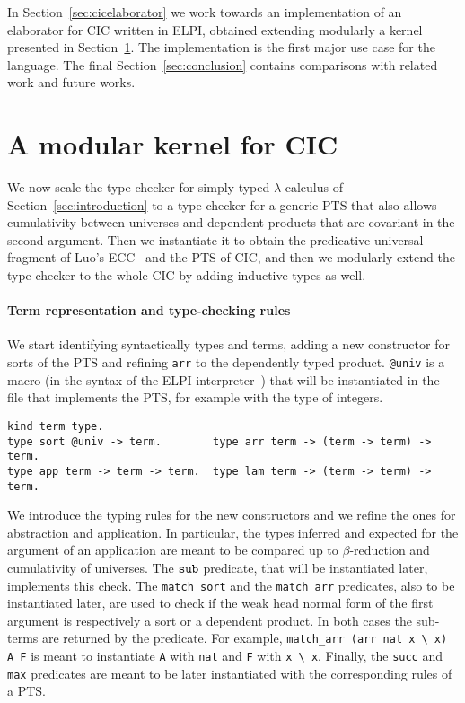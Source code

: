 \documentclass{easychair}
\begin{document}
In Section~\ref{sec:cicelaborator} we work towards an implementation of an elaborator for CIC written in ELPI, obtained extending modularly a kernel presented in Section~\ref{sec:kernel}. The implementation is the first major use case for the language.
The final Section~\ref{sec:conclusion} contains comparisons with related work and future works.

\section{A modular kernel for CIC}\label{sec:kernel}

We now scale the type-checker for simply typed $\lambda$-calculus of Section~\ref{sec:introduction} to a type-checker for a generic PTS that also allows cumulativity between universes and dependent products that are covariant in the second argument. Then we instantiate it to obtain the predicative universal fragment of Luo's ECC~\cite{ecc} and the PTS of CIC, and then we modularly extend the type-checker to the whole CIC by adding inductive types as well.

\paragraph{Term representation and type-checking rules}
We start identifying syntactically types and terms, adding a new constructor for sorts of the PTS and refining \verb+arr+ to the dependently typed product.
\verb+@univ+ is a macro (in the syntax of the ELPI interpreter~\cite{elpiLPAR}) that will be instantiated in the file that implements the PTS, for example with the type of integers.

\begin{Verbatim}
kind term type.
type sort @univ -> term.        type arr term -> (term -> term) -> term.
type app term -> term -> term.  type lam term -> (term -> term) -> term.
\end{Verbatim}

We introduce the typing rules for the new constructors and we refine the
ones for abstraction and application. In particular, the types inferred and
expected for the argument of an application are meant to be compared up to $\beta$-reduction and cumulativity of universes. The $\verb+sub+$ predicate, that will be instantiated later, implements this check. The \verb+match_sort+ and the \verb+match_arr+ predicates, also to be instantiated later, are used to check if the weak head normal form of the first argument is respectively a sort or a dependent product. In both cases the sub-terms are returned by the predicate. For example, \verb+match_arr (arr nat x \ x) A F+ is meant to instantiate \verb+A+ with \verb+nat+ and \verb+F+ with \verb+x \ x+. Finally, the \verb+succ+ and \verb+max+ predicates are meant to be later instantiated with the corresponding rules of a PTS.
\end{document}
